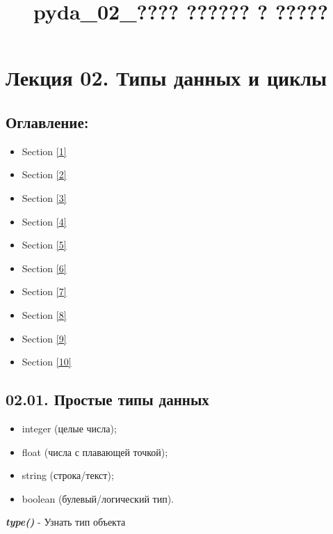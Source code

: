 \documentclass[11pt]{article}
\title{pyda\_02\_???? ?????? ? ?????}
\providecommand{\tightlist}{%
      \setlength{\itemsep}{0pt}\setlength{\parskip}{0pt}}
\begin{document}
    
    
    \maketitle
    
    

    
    \section{Лекция 02. Типы данных и
циклы}\label{ux43bux435ux43aux446ux438ux44f-02.-ux442ux438ux43fux44b-ux434ux430ux43dux43dux44bux445-ux438-ux446ux438ux43aux43bux44b}

    \subsection{Оглавление:}\label{ux43eux433ux43bux430ux432ux43bux435ux43dux438ux435}

\begin{itemize}
\tightlist
\item
  Section \ref{1}
\item
  Section \ref{2}
\item
  Section \ref{3}
\item
  Section \ref{4}
\item
  Section \ref{5}
\item
  Section \ref{6}
\item
  Section \ref{7}
\item
  Section \ref{8}
\item
  Section \ref{9}
\item
  Section \ref{10}
\end{itemize}

    \subsection{02.01. Простые типы данных
}\label{ux43fux440ux43eux441ux442ux44bux435-ux442ux438ux43fux44b-ux434ux430ux43dux43dux44bux445}

    \begin{itemize}
\tightlist
\item
  integer (целые числа);
\item
  float (числа с плавающей точкой);
\item
  string (строка/текст);
\item
  boolean (булевый/логический тип).
\end{itemize}

    \textbf{\emph{type()}} - Узнать тип объекта
\end{document}
